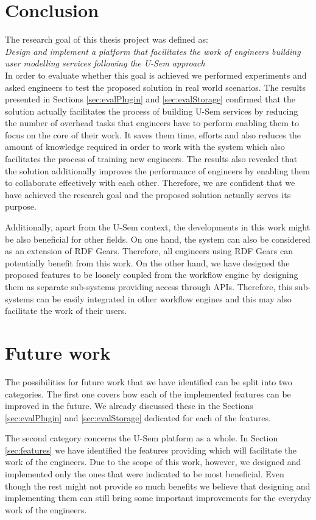 \section{Conclusion}
\label{sec:concDisc}

The research goal of this thesis project was defined as:\\

\textit{Design and implement a platform that facilitates the work of engineers building user modelling services following the U-Sem approach}\\

In order to evaluate whether this goal is achieved we performed experiments and asked engineers to test the proposed solution in real world scenarios. The results presented in Sections \ref{sec:evalPlugin} and \ref{sec:evalStorage} confirmed that the solution actually facilitates the process of building U-Sem services by reducing the number of overhead tasks that engineers have to perform enabling them to focus on the core of their work. It saves them time, efforts and also reduces the amount of knowledge required in order to work with the system which also facilitates the process of training new engineers. The results also revealed that the solution additionally improves the performance of engineers by enabling them to collaborate effectively with each other. Therefore, we are confident that we have achieved the research goal and the proposed solution actually serves its purpose.

Additionally, apart from the U-Sem context, the developments in this work might be also beneficial for other fields. On one hand, the system can also be considered as an extension of RDF Gears. Therefore, all engineers using RDF Gears can potentially benefit from this work. On the other hand, we have designed the proposed features to be loosely coupled from the workflow engine by designing them as separate sub-systems providing access through APIs. Therefore, this sub-systems can be easily integrated in other workflow engines and this may also facilitate the work of their users.

\section{Future work}
\label{sec:concFuture}

The possibilities for future work that we have identified can be split into two categories. The first one covers how each of the implemented features can be improved in the future. We already discussed these in the Sections \ref{sec:evalPlugin} and \ref{sec:evalStorage} dedicated for each of the features. 

The second category concerns the U-Sem platform as a whole. In Section \ref{sec:features} we have identified the features providing which will facilitate the work of the engineers. Due to the scope of this work, however, we designed and implemented only the ones that were indicated to be most beneficial. Even though the rest might not provide so much benefits we believe that designing and implementing them can still bring some important improvements for the everyday work of the engineers.
